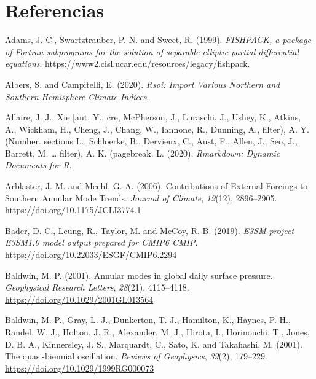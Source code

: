 \documentclass[12pt,oneside,a4paper]{reedthesis}
\newlength{\cslhangindent}
\newenvironment{CSLReferences}[2] %
 {%
  \setlength{\parindent}{0pt}
  \ifodd #1 \everypar{\setlength{\hangindent}{\cslhangindent}}\ignorespaces\fi
  \ifnum #2 > 0
  \setlength{\parskip}{#2\baselineskip}
  \fi
 }%
 {}
\begin{document}
\backmatter

\hypertarget{referencias}{%
\chapter*{Referencias}\label{referencias}}


\noindent

\setlength{\parindent}{-0.20in}

\hypertarget{refs}{}
\begin{CSLReferences}{1}{0}
\leavevmode{}%
Adams, J. C., Swartztrauber, P. N. and Sweet, R. (1999). \emph{{FISHPACK}, a package of {Fortran} subprograms for the solution of separable elliptic partial differential equations}. https://www2.cisl.ucar.edu/resources/legacy/fishpack.

\leavevmode{}%
Albers, S. and Campitelli, E. (2020). \emph{Rsoi: {Import Various Northern} and {Southern Hemisphere Climate Indices}}.

\leavevmode{}%
Allaire, J. J., Xie {[}aut, Y., cre, McPherson, J., Luraschi, J., Ushey, K., Atkins, A., Wickham, H., Cheng, J., Chang, W., Iannone, R., Dunning, A., filter), A. Y. (Number. sections L., Schloerke, B., Dervieux, C., Aust, F., Allen, J., Seo, J., Barrett, M. \ldots{} filter), A. K. (pagebreak. L. (2020). \emph{Rmarkdown: {Dynamic Documents} for {R}}.

\leavevmode{}%
Arblaster, J. M. and Meehl, G. A. (2006). Contributions of {External Forcings} to {Southern Annular Mode Trends}. \emph{Journal of Climate}, \emph{19}(12), 2896--2905. \url{https://doi.org/10.1175/JCLI3774.1}

\leavevmode{}%
Bader, D. C., Leung, R., Taylor, M. and McCoy, R. B. (2019). \emph{E3SM-project E3SM1.0 model output prepared for CMIP6 CMIP}. \url{https://doi.org/10.22033/ESGF/CMIP6.2294}

\leavevmode{}%
Baldwin, M. P. (2001). Annular modes in global daily surface pressure. \emph{Geophysical Research Letters}, \emph{28}(21), 4115--4118. \url{https://doi.org/10.1029/2001GL013564}

\leavevmode{}%
Baldwin, M. P., Gray, L. J., Dunkerton, T. J., Hamilton, K., Haynes, P. H., Randel, W. J., Holton, J. R., Alexander, M. J., Hirota, I., Horinouchi, T., Jones, D. B. A., Kinnersley, J. S., Marquardt, C., Sato, K. and Takahashi, M. (2001). The quasi-biennial oscillation. \emph{Reviews of Geophysics}, \emph{39}(2), 179--229. \url{https://doi.org/10.1029/1999RG000073}


\end{CSLReferences}
\end{document}
